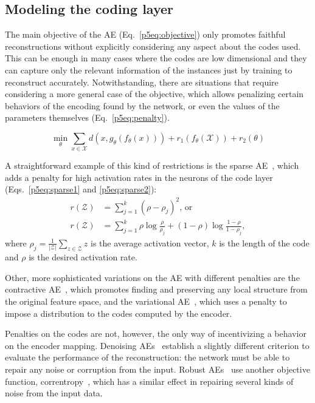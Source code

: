 \subsection{Modeling the coding layer}\label{p5sec:modelcode}

The main objective of the AE (Eq.~\ref{p5eq:objective}) only promotes faithful reconstructions without explicitly considering any aspect about the codes used. This can be enough in many cases where the codes are low dimensional and they can capture only the relevant information of the instances just by training to reconstruct accurately. Notwithstanding, there are situations that require considering a more general case of the objective, which allows penalizing certain behaviors of the encoding found by the network, or even the values of the parameters themselves (Eq.~\ref{p5eq:penalty}).

\begin{equation}\label{p5eq:penalty}
    \min_{\theta}\sum_{x\in\mathcal X} d(x,g_{\theta}(f_{\theta}(x)))+r_1(f_{\theta}(\mathcal X))+r_2(\theta)
\end{equation}

A straightforward example of this kind of restrictions is the sparse AE~\cite{lee_sparse_2008,ng2011sparse}, which adds a penalty for high activation rates in the neurons of the code layer (Eqs.~\ref{p5eq:sparse1} and \ref{p5eq:sparse2}):
\begin{align}
    \label{p5eq:sparse1}
    r(\mathcal Z)&=\sum_{j=1}^k(\rho-\rho_j)^2\mbox{, or}\\
    \label{p5eq:sparse2}
    r(\mathcal Z)&=\sum_{j=1}^k \rho \log\frac{\rho}{\rho_j}+(1-\rho)\log\frac{1-\rho}{1-\rho_j},
\end{align}
where $\rho_j=\frac{1}{\lvert\mathcal Z\rvert}\sum_{z\in \mathcal Z}z$ is the average activation vector, $k$ is the length of the code and $\rho$ is the desired activation rate.

Other, more sophisticated variations on the AE with different penalties are the contractive AE~\cite{contractive,rifai2011higher}, which promotes finding and preserving any local structure from the original feature space, and the variational AE~\cite{variational}, which uses a penalty to impose a distribution to the codes computed by the encoder.

Penalties on the codes are not, however, the only way of incentivizing a behavior on the encoder mapping. Denoising AEs~\cite{vincent2008extracting,sdae} establish a slightly different criterion to evaluate the performance of the reconstruction: the network must be able to repair any noise or corruption from the input.  Robust AEs~\cite{qi_robust_2014} use another objective function, correntropy~\cite{correntropy}, which has a similar effect in repairing several kinds of noise from the input data.

